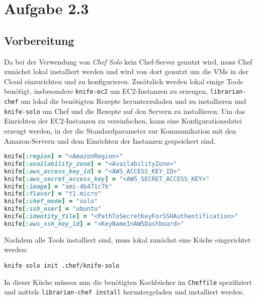 \documentclass[a4paper]{scrartcl}
\begin{document}
%
\section*{Aufgabe 2.3}
\subsection*{Vorbereitung}
Da bei der Verwendung von \emph{Chef Solo} kein Chef-Server genutzt wird, muss Chef zunächst lokal installiert werden und wird von dort genutzt um die VMs in der Cloud einzurichten und zu konfigurieren. Zusätzlich werden lokal einige Tools benötigt, insbesondere \verb|knife-ec2| um EC2-Instanzen zu erzeugen, \verb|librarian-chef| um lokal die benötigten Rezepte herunterzuladen und zu installieren und \verb|knife-solo| um Chef und die Rezepte auf den Servern zu installieren. Um das Einrichten der EC2-Instanzen zu vereinfachen, kann eine Konfigurationsdatei erzeugt werden, in der die Standardparameter zur Kommunikation mit den Amazon-Servern und dem Einrichten der Instanzen gespeichert sind.
\begin{lstlisting}[language=Ruby]
knife[:region] = "<AmazonRegion>"
knife[:availability_zone] = "<AvailabilityZone>"
knife[:aws_access_key_id] = "<AWS_ACCESS_KEY_ID>"
knife[:aws_secret_access_key] = "<AWS_SECRET_ACCESS_KEY>"
knife[:image] = "ami-4b471c7b"
knife[:flavor] = "t1.micro"
knife[:chef_mode] = "solo"
knife[:ssh_user] = "ubuntu"
knife[:identity_file] = "<PathToSecretKeyForSSHAuthentification>"
knife[:aws_ssh_key_id] = "<KeyNameInAWSDashboard>"
\end{lstlisting}
Nachdem alle Tools installiert sind, muss lokal zunächst eine Küche eingerichtet werden:
\begin{verbatim}
knife solo init .chef/knife-solo
\end{verbatim}
In dieser Küche müssen nun die benötigten Kochbücher im \texttt{Cheffile} spezifiziert und mittels \verb|librarian-chef install| heruntergeladen und installiert werden. 
\end{document}
